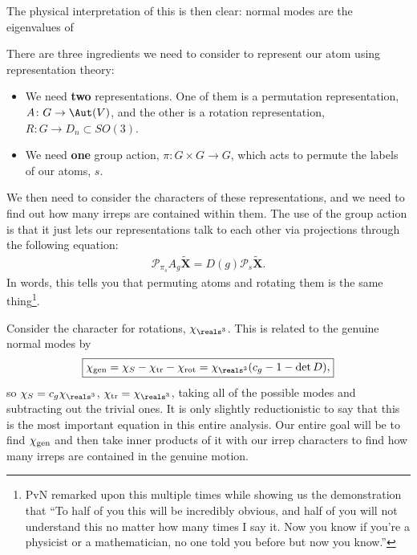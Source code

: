 \documentclass[11pt]{article}
\begin{document}
The physical interpretation of this is then clear: normal modes
are the eigenvalues of 

There are three ingredients we need to consider
to represent our atom using representation theory:
\begin{itemize}
    \item We need \textbf{two} representations. One of them
    is a permutation representation, $A \colon G \to \Aut(V)$,
    and the other is a rotation representation, $R \colon G \to D_n \subset SO(3)$.
    \item We need \textbf{one} group action, $\pi \colon G \times G \to G$,
    which acts to permute the labels of our atoms, $s$.
\end{itemize}

We then need to consider the characters of these representations,
and we need to find out how many irreps are contained within them.
The use of the group action is that it just lets our representations 
talk to each other via projections through the following equation:
\begin{align*}
    \boxed{\mathcal{P}_{\pi_s} A_g \widetilde{\mathbf{X}} = D(g) \mathcal{P}_s \widetilde{\mathbf{X}}.}
\end{align*}
In words, this tells you that permuting atoms and rotating them
is the same thing\footnote{PvN remarked upon this multiple times
while showing us the demonstration that ``To half of you this will
be incredibly obvious, and half of you will not understand
this no matter how many times I say it. Now you know if you're
a physicist or a mathematician, no one told you before but now you know.''
}.

Consider the character for rotations, $\chi_{\reals^3}$. This is related
to the genuine normal modes by
\begin{align*}
    \boxed{\chi_{\rm gen} = \chi_S - \chi_{\rm tr} - \chi_{\rm rot} = \chi_{\reals^3} (c_g - 1 - \det{D}),}
\end{align*}
so $\chi_S = c_g \chi_{\reals^3}$, $\chi_{\rm tr} = \chi_{\reals^3}$,
taking all of the possible modes and subtracting out the trivial ones.
It is only slightly reductionistic to say that this is the most important equation
in this entire analysis. Our entire goal will be to find $\chi_{\rm gen}$
and then take inner products of it with our irrep characters to find how 
many irreps are contained in the genuine motion.

\end{document}
